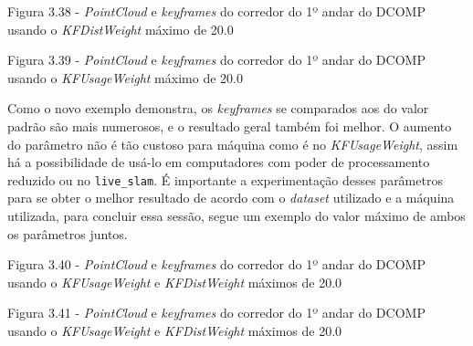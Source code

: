 Figura 3.38 - \textit{PointCloud} e \textit{keyframes} do corredor do 1º andar do DCOMP usando o \textit{KFDistWeight} máximo de 20.0

Figura 3.39 - \textit{PointCloud} e \textit{keyframes} do corredor do 1º andar do DCOMP usando o \textit{KFUsageWeight} máximo de 20.0

Como o novo exemplo demonstra, os \textit{keyframes} se comparados aos do valor padrão são mais numerosos, e o resultado geral também foi melhor. O aumento do parâmetro não é tão custoso para máquina como é no \textit{KFUsageWeight}, assim há a possibilidade de usá-lo em computadores com poder de processamento reduzido ou no \texttt{live\_slam}. É importante a experimentação desses parâmetros para se obter o melhor resultado de acordo com o \textit{dataset} utilizado e a máquina utilizada, para concluir essa sessão, segue um exemplo do valor máximo de ambos os parâmetros juntos.

Figura 3.40 - \textit{PointCloud} e \textit{keyframes} do corredor do 1º andar do DCOMP usando o \textit{KFUsageWeight} e \textit{KFDistWeight} máximos de 20.0

Figura 3.41 - \textit{PointCloud} e \textit{keyframes} do corredor do 1º andar do DCOMP usando o \textit{KFUsageWeight} e \textit{KFDistWeight} máximos de 20.0

